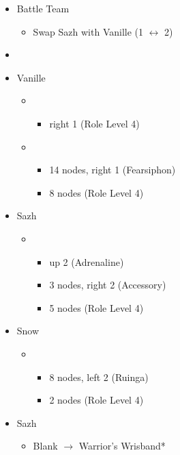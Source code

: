 \begin{menu}
	\begin{itemize}
		\paradigm
		\begin{itemize}
			\item Battle Team
				\begin{itemize}
					\item Swap Sazh with Vanille (1 $\leftrightarrow$ 2)
				\end{itemize}
			\item {}%
				{\paradigmline{\com}{(\com)}{\com}}%
				{\paradigmline{(\sab)}{\com}{\com}}%
				{\paradigmline{\rav}{\rav}{\sen}}%
				{\paradigmline{(\sab)}{(\syn)}{\sen}}%
				{\paradigmline[4]{(\sab)}{\rav}{(\rav)}}%
				{\paradigmline{\rav}{\rav}{\rav}}%
		\end{itemize}
		\crystarium
		\begin{itemize}
			\item Vanille
				\begin{itemize}
					\item \med
						\begin{itemize}
							\item right 1 (Role Level 4)
						\end{itemize}
					\item \rav
						\begin{itemize}
							\item 14 nodes, right 1 (Fearsiphon)
							\item 8 nodes (Role Level 4)
						\end{itemize}
				\end{itemize}
			\item Sazh
				\begin{itemize}
					\item \com
						\begin{itemize}
							\item up 2 (Adrenaline)
							\item 3 nodes, right 2 (Accessory)
							\item 5 nodes (Role Level 4)
						\end{itemize}
				\end{itemize}
			\item Snow
				\begin{itemize}
					\item \com
						\begin{itemize}
							\item 8 nodes, left 2 (Ruinga)
							\item 2 nodes (Role Level 4)
						\end{itemize}
				\end{itemize}
		\end{itemize}
		\equip
		\begin{itemize}
			\item Sazh
				\begin{itemize}
					\item Blank $\rightarrow$ Warrior's Wrisband*
				\end{itemize}
		\end{itemize}
	\end{itemize}
\end{menu}

